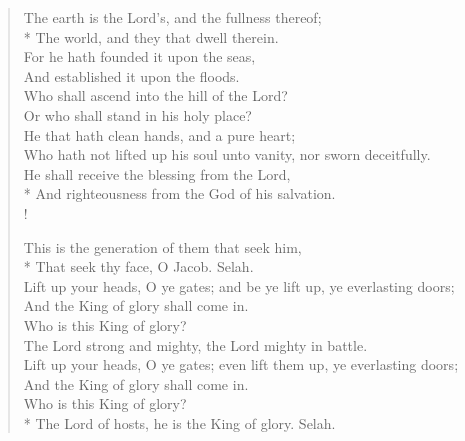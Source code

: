 \documentclass[MAIN]{subfiles}
\begin{document}
\begin{verse}
The earth is the Lord's, and the fullness\marginnote{$\cdot$} thereof;\\*
\vin The world, and they that dwell therein.\\
For he hath founded it upon the seas,\\
\vin And established it upon the floods.\\
Who shall ascend into the hill of the Lord?\\
\vin Or who shall stand in his holy place?\\
He that hath clean hands, and a pure heart;\\
\vin Who hath not lifted up his soul unto vanity, nor sworn deceitfully.\\
He shall receive the blessing from the Lord,\\*
\vin And righteousness from the God of his salvation.\\!

This is the generation of them that seek him,\\*
\vin That seek thy face, O Jacob. {\hge Selah}.\\
Lift up your heads, O ye gates; and be ye lift up, ye everlasting doors;\\
\vin And the King of glory shall come in.\\
Who is this King of glory?\\
\vin The Lord strong and mighty, the Lord mighty in battle.\\
Lift up your heads, O ye gates; even lift them up, ye everlasting doors;\\
\vin And the King of glory shall come in.\\
Who is this King of glory?\\*
\vin The Lord of hosts, he is the King of glory. {\hge Selah}.
\end{verse}
\end{document}

